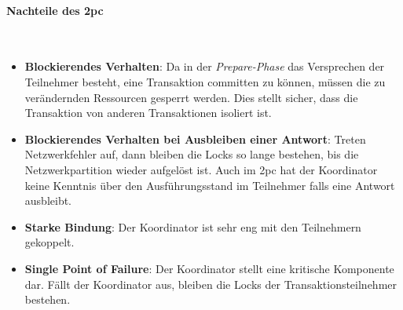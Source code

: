\paragraph*{Nachteile des \acrshort{2pc}} \mbox{} \\
\begin{itemize}
	\item \textbf{Blockierendes Verhalten}: Da in der \textit{Prepare-Phase} das Versprechen der Teilnehmer besteht, eine Transaktion committen zu können, müssen die zu verändernden Ressourcen gesperrt werden. Dies stellt sicher, dass die Transaktion von anderen Transaktionen isoliert ist. 
	\item \textbf{Blockierendes Verhalten bei Ausbleiben einer Antwort}: Treten Netzwerkfehler auf, dann bleiben die Locks so lange bestehen, bis die Netzwerkpartition wieder aufgelöst ist. Auch im \acrshort{2pc} hat der Koordinator keine Kenntnis über den Ausführungsstand im Teilnehmer falls eine Antwort ausbleibt.  
	\item \textbf{Starke Bindung}: Der Koordinator ist sehr eng mit den Teilnehmern gekoppelt.
	\item \textbf{Single Point of Failure}: Der Koordinator stellt eine kritische Komponente dar. Fällt der Koordinator aus, bleiben die Locks der Transaktionsteilnehmer bestehen.
\end{itemize}
